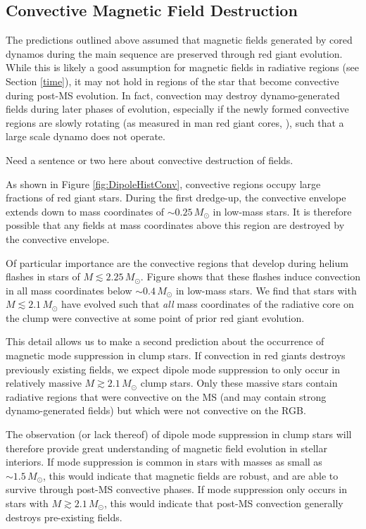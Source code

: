 \subsection{Convective Magnetic Field Destruction}

The predictions outlined above assumed that magnetic fields generated by cored dynamos during the main sequence are preserved through red giant evolution. While this is likely a good assumption for magnetic fields in radiative regions (see Section \ref{time}), it may not hold in regions of the star that become convective during post-MS evolution. In fact, convection may destroy dynamo-generated fields during later phases of evolution, especially if the newly formed convective regions are slowly rotating (as measured in man red giant cores, \cite{Mosser_2012}), such that a large scale dynamo does not operate.

Need a sentence or two here about convective destruction of fields. 

As shown in Figure \ref{fig:DipoleHistConv}, convective regions occupy large fractions of red giant stars. During the first dredge-up, the convective envelope extends down to mass coordinates of $ \sim 0.25 \! \, M_\odot$ in low-mass stars. It is therefore possible that any fields at mass coordinates above this region are destroyed by the convective envelope.

Of particular importance are the convective regions that develop during helium flashes in stars of $M \lesssim 2.25 \, M_\odot$. Figure \label{fig:DipoleHistConv} shows that these flashes induce convection in all mass coordinates below $ \sim \! 0.4 \, M_\odot$ in low-mass stars. We find that stars with $M \lesssim 2.1 \, M_\odot$ have evolved such that {\it all} mass coordinates  of the radiative core on the clump were convective at some point of prior red giant evolution. 

This detail allows us to make a second prediction about the occurrence of magnetic mode suppression in clump stars. If convection in red giants destroys previously existing fields, we expect dipole mode suppression to only occur in relatively massive $M \gtrsim 2.1 \, M_\odot$ clump stars. Only these massive stars contain radiative regions that were convective on the MS (and may contain strong dynamo-generated fields) but which were not convective on the RGB. 

The observation (or lack thereof) of dipole mode suppression in clump stars will therefore provide great understanding of magnetic field evolution in stellar interiors. If mode suppression is common in stars with masses as small as $\sim \! 1.5 \, M_\odot$, this would indicate that magnetic fields are robust, and are able to survive through post-MS convective phases. If mode suppression only occurs in stars with $M \gtrsim 2.1 \, M_\odot$, this would indicate that post-MS convection generally destroys pre-existing fields. 


